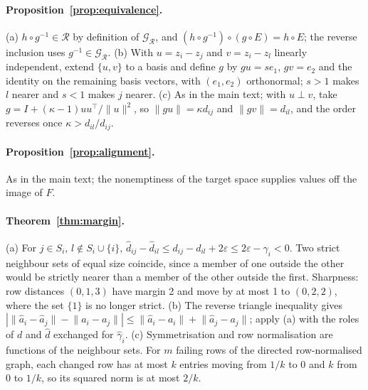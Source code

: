 \documentclass[letterpaper]{article} %
\theoremstyle{definition}
\newcommand{\norm}[1]{\lVert #1\rVert}
\begin{document}
\paragraph{Proposition~\ref{prop:equivalence}.} (a) $h\circ g^{-1}\in\mathcal R$
by definition of $\mathcal G_{\mathcal R}$, and $(h\circ g^{-1})\circ(g\circ E)
=h\circ E$; the reverse inclusion uses $g^{-1}\in\mathcal G_{\mathcal R}$.
(b) With $u=z_i-z_j$ and $v=z_i-z_l$ linearly independent, extend $\{u,v\}$ to a
basis and define $g$ by $gu=se_1$, $gv=e_2$ and the identity on the remaining
basis vectors, with $(e_1,e_2)$ orthonormal; $s>1$ makes $l$ nearer and $s<1$
makes $j$ nearer. (c) As in the main text; with $u\perp v$, take
$g=I+(\kappa-1)uu^\top/\norm u^2$, so $\norm{gu}=\kappa d_{ij}$ and
$\norm{gv}=d_{il}$, and the order reverses once $\kappa>d_{il}/d_{ij}$.

\paragraph{Proposition~\ref{prop:alignment}.} As in the main text; the
nonemptiness of the target space supplies values off the image of $F$.

\paragraph{Theorem~\ref{thm:margin}.} (a) For $j\in S_i$, $l\notin S_i\cup\{i\}$,
$\hat d_{ij}-\hat d_{il}\le d_{ij}-d_{il}+2\varepsilon\le2\varepsilon-\gamma_i<0$.
Two strict neighbour sets of equal size coincide, since a member of one outside
the other would be strictly nearer than a member of the other outside the
first. Sharpness: row distances $(0,1,3)$ have margin 2 and move by at most 1 to
$(0,2,2)$, where the set $\{1\}$ is no longer strict. (b) The reverse triangle
inequality gives $|\norm{\hat a_i-\hat a_j}-\norm{a_i-a_j}|\le
\norm{\hat a_i-a_i}+\norm{\hat a_j-a_j}$; apply (a) with the roles of $d$ and
$\hat d$ exchanged for $\hat\gamma_i$. (c) Symmetrisation and row normalisation
are functions of the neighbour sets. For $m$ failing rows of the directed
row-normalised graph, each changed row has at most $k$ entries moving from
$1/k$ to $0$ and $k$ from $0$ to $1/k$, so its squared norm is at most $2/k$.
\end{document}
